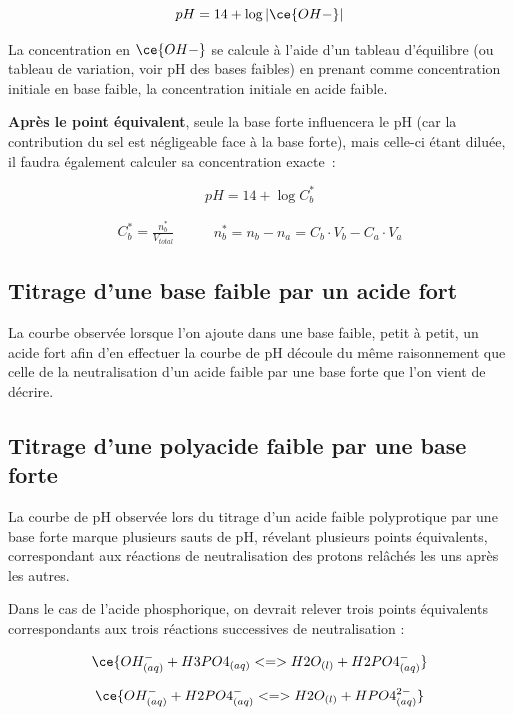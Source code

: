 \documentclass[
  11pt,
  a4paper,
  openany]{book}
\begin{document}
\[
pH = 14 + \log |\ce{OH-}|
\]

La concentration en \(\ce{OH-}\) se calcule à l'aide d'un tableau d'équilibre (ou tableau de variation, voir pH des bases faibles) en prenant comme concentration initiale en base faible, la concentration initiale en acide faible.

\textbf{Après le point équivalent}, seule la base forte influencera le pH (car la contribution du sel est négligeable face à la base forte), mais celle-ci étant diluée, il faudra également calculer sa concentration exacte~:

\[
pH = 14 + \log C_b^*
\]

\[
\begin{split}
C_b^* = \frac{n_b^*}{V_{total}}
\end{split}
\qquad
\begin{split}
n_b^* = n_b - n_a = C_b \cdot V_b - C_a \cdot V_a
\end{split}
\]

\subsection{Titrage d'une base faible par un acide fort}\label{titrage-dune-base-faible-par-un-acide-fort}

La courbe observée lorsque l'on ajoute dans une base faible, petit à petit, un acide fort afin d'en effectuer la courbe de pH découle du même raisonnement que celle de la neutralisation d'un acide faible par une base forte que l'on vient de décrire.

\clearpage

\subsection{Titrage d'une polyacide faible par une base forte}\label{titrage-dune-polyacide-faible-par-une-base-forte}

La courbe de pH observée lors du titrage d'un acide faible polyprotique par une base forte marque plusieurs sauts de pH, révelant plusieurs points équivalents, correspondant aux réactions de neutralisation des protons relâchés les uns après les autres.

Dans le cas de l'acide phosphorique, on devrait relever trois points équivalents correspondants aux trois réactions successives de neutralisation :

\[
\ce{OH^{-}_{(aq)} + H3PO4_{(aq)} <=> H2O_{(l)} + H2PO4^{-}_{(aq)}}
\]

\[
\ce{OH^{-}_{(aq)} + H2PO4^{-}_{(aq)} <=> H2O_{(l)} + HPO4^{2-}_{(aq)}}
\]
\end{document}
